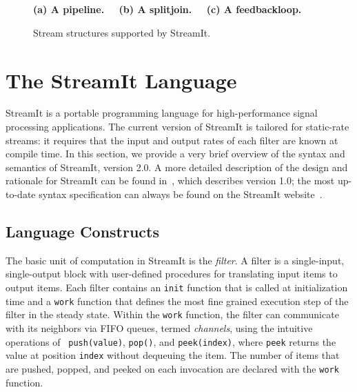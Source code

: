 \begin{figure}[t]
\begin{center}
\begin{minipage}{0.46in}
\centering
{} \\
\end{minipage} 
~
\begin{minipage}{1.3in}
\centering
{} \\
\end{minipage}
~
\begin{minipage}{1.02in}
\centering
{} \\
\end{minipage} 
\\ ~ \\ {\bf \protect\small (a) A pipeline. ~~(b) A splitjoin. ~~(c) A feedbackloop.}
\caption{\protect\small Stream structures supported by StreamIt.
\protect\label{fig:structures}}
\end{center}
\end{figure}

\section{The StreamIt Language}
\label{sec:streamit}

StreamIt is a portable programming language for high-performance
signal processing applications.  The current version of StreamIt is
tailored for static-rate streams: it requires that the input and
output rates of each filter are known at compile time.  In this
section, we provide a very brief overview of the syntax and semantics
of StreamIt, version 2.0.  A more detailed description of the design
and rationale for StreamIt can be found in~\cite{streamitcc}, which
describes version 1.0; the most up-to-date syntax specification can
always be found on the StreamIt website~\cite{streamitweb}.

\subsection{Language Constructs}

The basic unit of computation in StreamIt is the {\it filter}.  A
filter is a single-input, single-output block with user-defined
procedures for translating input items to output items.  Each filter
contains an {\tt init} function that is called at initialization time
and a {\tt work} function that defines the most fine grained execution
step of the filter in the steady state.  Within the {\tt work}
function, the filter can communicate with its neighbors via FIFO
queues, termed {\it channels}, using the intuitive operations of {\tt
push(value)}, {\tt pop()}, and {\tt peek(index)}, where {\tt peek}
returns the value at position {\tt index} without dequeuing the item.
The number of items that are pushed, popped, and peeked on each
invocation are declared with the {\tt work} function.

